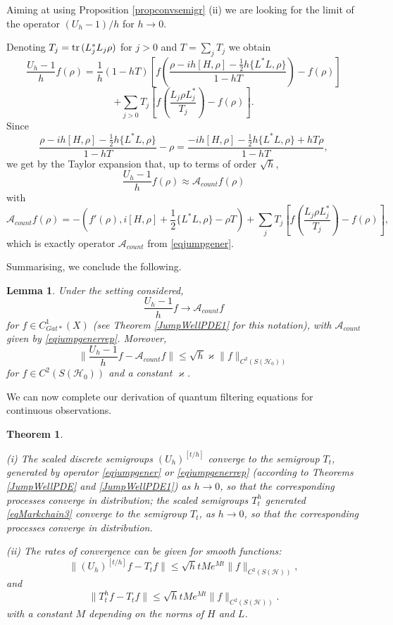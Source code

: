 \documentclass[12pt]{article}
\def\AC{\mathcal{A}}
\def\HC{\mathcal{H}}
\def\tr{\rm{tr}}
\def\ka{\varkappa}
\newtheorem{theorem}{Theorem}[section]
\newtheorem{lemma}{Lemma}[section]
\begin{document}
Aiming at using Proposition \ref{propconvsemigr} (ii) we are looking for
the limit of the operator $(U_h-1)/h$ for $h \to 0$.

Denoting $T_j=  {\tr}\, (L_j^*L_j \rho)$ for $j>0$ and $T=\sum_j T_j$ we obtain
\[
\frac{U_h-1}{h} f(\rho)=\frac{1}{h} (1-hT)
\left[f \left( \frac{\rho -ih[H, \rho] -\frac12 h\{L^*L,\rho\}}{1-h T}\right)-f(\rho)\right]
\]
\[
+\sum_{j>0} T_j \left[f(\frac{L_j\rho L_j^*}{T_j})-f(\rho)\right].
\]
Since
\[
\frac{\rho -ih[H, \rho] -\frac12 h\{L^*L,\rho\}}{1-h T}-\rho
=\frac{-ih[H, \rho] -\frac12 h\{L^*L,\rho\}+h T \rho}{1-h T},
\]
we get by the Taylor expansion that, up to terms of order $\sqrt h$,
\[
\frac{U_h-1}{h} f(\rho)\approx \AC_{count} f(\rho)
\]
with
\begin{equation}
\label{eqjumpgenerrep}
\AC_{count}f(\rho)=-(f'(\rho), i[H, \rho] +\frac12 \{L^*L,\rho\}-\rho T)
+\sum_j T_j \left[f(\frac{L_j\rho L_j^*}{T_j})-f(\rho)\right],
\end{equation}
which is exactly operator $\AC_{count}$ from \eqref{eqjumpgener}.

Summarising, we conclude the following.

\begin{lemma}
\label{lemmaongencount}
Under the setting considered,
\begin{equation}
\label{eqjumpgener0}
\frac{U_h-1}{h} f \to \AC_{count}f
\end{equation}
for $f\in C^1_{Gat*}(X)$ (see Theorem \ref{JumpWellPDE1} for this notation),
with $\AC_{count}$ given by \eqref{eqjumpgenerrep}. Moreover,
\begin{equation}
\label{eqjumpgener1}
\|\frac{U_h-1}{h} f -\AC_{count}f\|\le \sqrt h \ka \|f\|_{C^2(S(\HC_0))}
\end{equation}
for $f\in C^2(S(\HC_0))$ and a constant $\ka$.
\end{lemma}

We can now complete our derivation of quantum filtering equations for continuous observations.

\begin{theorem}
\label{thBeleqcount}

(i) The scaled discrete semigroups $(U_h)^{[t/h]}$ converge to the semigroup $T_t$,
generated by operator \eqref{eqjumpgener} or \eqref{eqjumpgenerrep}
(according to Theorems \ref{JumpWellPDE} and \ref{JumpWellPDE1})
as $h\to 0$, so that the corresponding
processes converge in distribution; the scaled semigroups $T_t^h$ generated
 \eqref{eqMarkchain3} converge to the semigroup $T_t$, as $h\to 0$,
so that the corresponding
processes converge in distribution.

(ii) The rates of convergence can be given for smooth functions:
\begin{equation}
\label{eq1thBeleqcount}
\|(U_h)^{[t/h]}f -T_tf\| \le \sqrt h t M e^{Mt} \|f\|_{C^2(S(\HC))},
\end{equation}
and
\begin{equation}
\label{eq2thBeleqcount}
\|T_t^h f -T_tf\| \le \sqrt h t Me^{Mt} \|f\|_{C^2(S(\HC))}.
\end{equation}
with a constant $M$ depending on the norms of $H$ and $L$.
\end{theorem}
\end{document}
